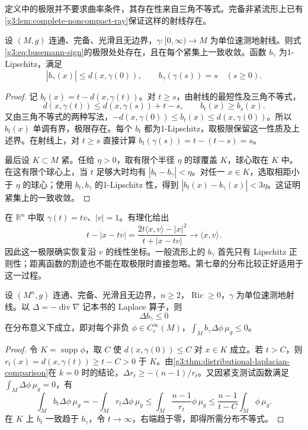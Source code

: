 定义中的极限并不要求曲率条件，其存在性来自三角不等式。完备非紧流形上已有\cref{g3:lem:complete-noncompact-ray}保证这样的射线存在。

\begin{proposition}\label{g3:prop:busemann-basic}
	设 \((M,g)\) 连通、完备、光滑且无边界，\(\gamma:[0,\infty)\to M\) 为单位速测地射线。则式\eqref{g3:eq:busemann-sign}的极限处处存在，且在每个紧集上一致收敛。函数 \(b_\gamma\) 为1-Lipschitz，满足
	\[
		|b_\gamma(x)|\le d(x,\gamma(0)),\qquad
		b_\gamma(\gamma(s))=s\quad(s\ge0).
	\]
\end{proposition}
\begin{proof}
	记 \(b_t(x)=t-d(x,\gamma(t))\)。对 \(t\ge s\)，由射线的最短性及三角不等式，
	\[
		d(x,\gamma(t))\le d(x,\gamma(s))+t-s,
		\qquad b_t(x)\ge b_s(x).
	\]
	又由三角不等式的两种写法，\(-d(x,\gamma(0))\le b_t(x)\le d(x,\gamma(0))\)。所以 \(b_t(x)\) 单调有界，极限存在。每个 \(b_t\) 都为1-Lipschitz，取极限保留这一性质及上述界。在射线上，对 \(t\ge s\) 直接计算 \(b_t(\gamma(s))=t-(t-s)=s\)。

	最后设 \(K\subset M\) 紧。任给 \(\eta>0\)，取有限个半径 \(\eta\) 的球覆盖 \(K\)，球心取在 \(K\) 中。在这有限个球心上，当 \(t\) 足够大时均有 \(|b_t-b_\gamma|<\eta\)。对任一 \(x\in K\)，选取相距小于 \(\eta\) 的球心；使用 \(b_t,b_\gamma\) 的1-Lipschitz 性，得到 \(|b_t(x)-b_\gamma(x)|<3\eta\)。这证明紧集上的一致收敛。
\end{proof}

在 \(\mathbb R^n\) 中取 \(\gamma(t)=tv\)、\(|v|=1\)。有理化给出
\[
	 t-|x-tv|
	=\frac{2t\langle x,v\rangle-|x|^2}{t+|x-tv|}
	\longrightarrow\langle x,v\rangle.
\]
因此这一极限确实恢复沿 \(v\) 的线性坐标。一般流形上的 \(b_\gamma\) 首先只有 Lipschitz 正则性；距离函数的割迹也不能在取极限时直接忽略。第七章的分布比较正好适用于这一过程。

\begin{proposition}\label{g3:prop:busemann-weak-laplacian}
	设 \((M^n,g)\) 连通、完备、光滑且无边界，\(n\ge2\)，\(\operatorname{Ric}\ge0\)，\(\gamma\) 为单位速测地射线。以 \(\Delta=-\operatorname{div}\nabla\) 记本书的 Laplace 算子，则
	\[
		\Delta b_\gamma\le0
	\]
	在分布意义下成立，即对每个非负 \(\phi\in C_c^\infty(M)\)，\(\int_M b_\gamma\Delta\phi\,\mu_g\le0\)。
\end{proposition}
\begin{proof}
	令 \(K=\operatorname{supp}\phi\)，取 \(C\) 使 \(d(x,\gamma(0))\le C\) 对 \(x\in K\) 成立。若 \(t>C\)，则 \(r_t(x)=d(x,\gamma(t))\ge t-C>0\) 于 \(K\)。由\cref{g3:thm:distributional-laplacian-comparison}在 \(k=0\) 时的结论，\(\Delta r_t\ge-(n-1)/r_t\)。又因紧支测试函数满足 \(\int_M\Delta\phi\,\mu_g=0\)，有
	\[
		\int_M b_t\Delta\phi\,\mu_g
		=-\int_M r_t\Delta\phi\,\mu_g
		\le\int_M\frac{n-1}{r_t}\phi\,\mu_g
		\le\frac{n-1}{t-C}\int_M\phi\,\mu_g.
	\]
	在 \(K\) 上 \(b_t\) 一致趋于 \(b_\gamma\)，令 \(t\to\infty\)，右端趋于零，即得所需分布不等式。
\end{proof}

